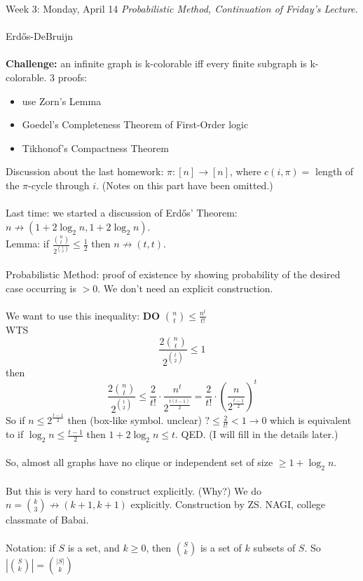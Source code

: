 \documentclass[12pt]{article}
\theoremstyle{remark}
\begin{document}
\newpage
\label{7}\begin{section}{Week 3: Monday, April 14}
\indent\textit{Probabilistic Method, Continuation of Friday's Lecture.}\\\\
Erd\H{o}s-DeBruijn
\\\\
\textbf{Challenge:} an infinite graph is k-colorable iff every finite subgraph is k-colorable. 3 proofs:
\begin{itemize}
\item use Zorn's Lemma
\item Goedel's Completeness Theorem of First-Order logic
\item Tikhonof's Compactness Theorem
\end{itemize}
Discussion about the last homework: $\pi: [n] \to [n]$, where $c(i,\pi) =$ length of the $\pi$-cycle through $i$. (Notes on this part have been omitted.)
\\\\
Last time: we started a discussion of Erd\H{o}s' Theorem: $n \not \to (1+2\log_2n,1+2\log_2 n)$.
\\Lemma: if $\frac{{n \choose t}}{2^{t \choose 2}} \leq \frac 12$ then $n \not \to (t,t)$.
\\\\
Probabilistic Method: proof of existence by showing probability of the desired case occurring is $>0$. We don't need an explicit construction. 
\\\\
We want to use this inequality: \textbf{DO} ${n \choose t} \leq \frac{n^t}{t!}$
\\WTS $$\frac{2{n \choose t}}{2^{t \choose 2}} \leq 1$$ then 
$$\frac{2{n \choose t}}{2^{t \choose 2}} \leq \frac{2}{t!} \cdot \frac{n^t}{2^\frac{t(t-1)}{2}} = \frac{2}{t!} \cdot \left(\frac{n}{2^{\frac{t-1}{2}}}\right)^t$$
So if $n \leq 2^{\frac{t-1}{2}}$ then (box-like symbol. unclear) $? \leq \frac{2}{t!} < 1 \to 0$ which is equivalent to if $\log_2 n \leq \frac{t-1}{2}$ then $1 + 2\log_2 n \leq t$. QED. (I will fill in the details later.)
\\\\
So, almost all graphs have no clique or independent set of size $\geq 1+ \log_2 n$. 
\\\\
But this is very hard to construct explicitly. (Why?) We do $n = {k \choose 3} \not \to (k+1,k+1)$ explicitly. Construction by ZS. NAGI, college classmate of Babai. 
\\\\Notation: if $S$ is a set, and $k \geq 0$, then ${S \choose k}$ is a set of $k$ subsets of $S$. So $|{S \choose k}| = {|S| \choose k}$

\end{section}
\end{document}
